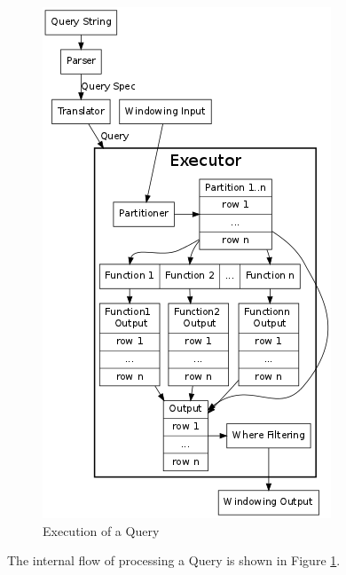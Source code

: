 \documentclass[pdftex,10pt,a4paper]{article}
\begin{document}
\begin{figure}[h]
\centering
    \includegraphics[scale=0.5]{query.png}
\caption{Execution of a Query}
\label{qry}
  \end{figure}
  The internal  flow of processing a Query  is shown in Figure \ref{qry}.
\end{document}
